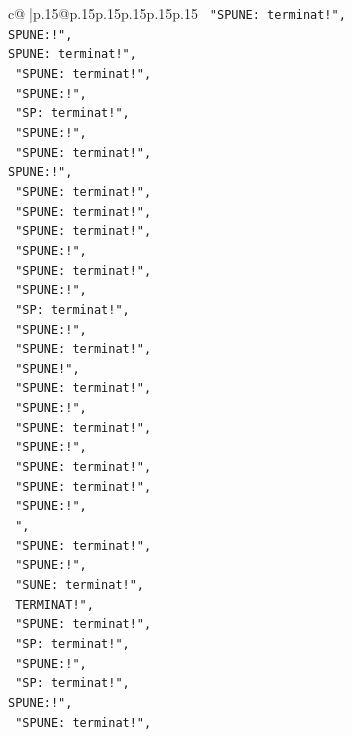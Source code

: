 \documentclass{article}
\begin{document}
{\begin{supertabular}{c@{$\;$}|p{.15\linewidth}@{}p{.15\linewidth}p{.15\linewidth}p{.15\linewidth}p{.15\linewidth}p{.15\linewidth}}
{{{\texttt{    "SPUNE: terminat!",} \\
\texttt{SPUNE:!",} \\
\texttt{SPUNE: terminat!",} \\
\texttt{    "SPUNE: terminat!",} \\
\texttt{    "SPUNE:!",} \\
\texttt{    "SP: terminat!",} \\
\texttt{    "SPUNE:!",} \\
\texttt{    "SPUNE: terminat!",} \\
\texttt{SPUNE:!",} \\
\texttt{    "SPUNE: terminat!",} \\
\texttt{    "SPUNE: terminat!",} \\
\texttt{    "SPUNE: terminat!",} \\
\texttt{    "SPUNE:!",} \\
\texttt{    "SPUNE: terminat!",} \\
\texttt{    "SPUNE:!",} \\
\texttt{    "SP: terminat!",} \\
\texttt{    "SPUNE:!",} \\
\texttt{    "SPUNE: terminat!",} \\
\texttt{    "SPUNE!",} \\
\texttt{    "SPUNE: terminat!",} \\
\texttt{    "SPUNE:!",} \\
\texttt{    "SPUNE: terminat!",} \\
\texttt{    "SPUNE:!",} \\
\texttt{    "SPUNE: terminat!",} \\
\texttt{    "SPUNE: terminat!",} \\
\texttt{    "SPUNE:!",} \\
\texttt{   ",} \\
\texttt{    "SPUNE: terminat!",} \\
\texttt{    "SPUNE:!",} \\
\texttt{    "SUNE: terminat!",} \\
\texttt{    TERMINAT!",} \\
\texttt{    "SPUNE: terminat!",} \\
\texttt{    "SP: terminat!",} \\
\texttt{    "SPUNE:!",} \\
\texttt{    "SP: terminat!",} \\
\texttt{SPUNE:!",} \\
\texttt{    "SPUNE: terminat!",} \\
}}}
\end{supertabular}}
\end{document}

